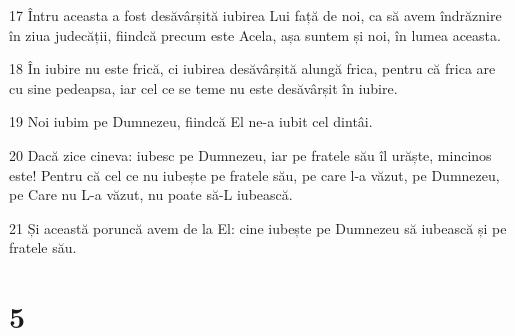 \par 17 Întru aceasta a fost desăvârșită iubirea Lui față de noi, ca să avem îndrăznire în ziua judecății, fiindcă precum este Acela, așa suntem și noi, în lumea aceasta.
\par 18 În iubire nu este frică, ci iubirea desăvârșită alungă frica, pentru că frica are cu sine pedeapsa, iar cel ce se teme nu este desăvârșit în iubire.
\par 19 Noi iubim pe Dumnezeu, fiindcă El ne-a iubit cel dintâi.
\par 20 Dacă zice cineva: iubesc pe Dumnezeu, iar pe fratele său îl urăște, mincinos este! Pentru că cel ce nu iubește pe fratele său, pe care l-a văzut, pe Dumnezeu, pe Care nu L-a văzut, nu poate să-L iubească.
\par 21 Și această poruncă avem de la El: cine iubește pe Dumnezeu să iubească și pe fratele său.

\chapter{5}

